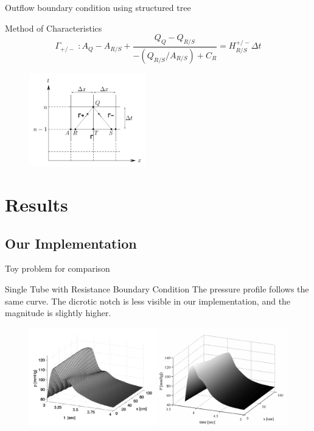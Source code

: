 \documentclass{beamer}
\begin{document}

\begin{frame}{Outflow boundary condition using structured tree}
\begin{block}{Method of Characteristics}
	 \begin{equation}
 		\label{characteristics}
 		\Gamma_{+/-}\; : A_Q - A_{R/S} + \frac{Q_Q - Q_{R/S}}{-(Q_{R/S}/A_{R/S}) + C_R} = H_{R/S}^{+/-} \Delta t
	\end{equation}
\end{block}

\begin{figure}[ht]
	\centering
	\label{characteristicplot}
	\includegraphics[width=2in]{characterplot}
\end{figure}

\end{frame}

\section{Results}

\subsection{Our Implementation}
\begin{frame}{Toy problem for comparison}

\begin{block}{Single Tube with Resistance Boundary Condition}
	The pressure profile follows the same curve. The dicrotic notch is less visible in our implementation, and the magnitude is slightly higher. 
\end{block}

\begin{figure}[ht]
	\centering
	\includegraphics[width=4.5in]{pplot}
	\label{ours}
\end{figure}

\end{frame}
\end{document}
